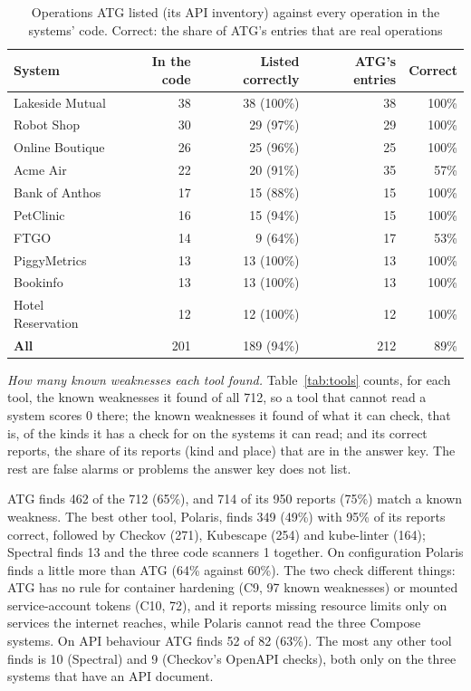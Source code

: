 \documentclass[conference]{IEEEtran}
\begin{document}
\begin{table}[!htbp]
\caption{Operations ATG listed (its API inventory) against every operation in the systems' code. Correct: the share of ATG's entries that are real operations}
\label{tab:ops}
\centering
\footnotesize
\setlength{\tabcolsep}{3pt}
\begin{tabular}{@{}lrrrr@{}}
\toprule
System & In the code & Listed correctly & ATG's entries & Correct \\
\midrule
Lakeside Mutual & 38 & 38 (100\%) & 38 & 100\% \\
Robot Shop & 30 & 29 (97\%) & 29 & 100\% \\
Online Boutique & 26 & 25 (96\%) & 25 & 100\% \\
Acme Air & 22 & 20 (91\%) & 35 & 57\% \\
Bank of Anthos & 17 & 15 (88\%) & 15 & 100\% \\
PetClinic & 16 & 15 (94\%) & 15 & 100\% \\
FTGO & 14 & 9 (64\%) & 17 & 53\% \\
PiggyMetrics & 13 & 13 (100\%) & 13 & 100\% \\
Bookinfo & 13 & 13 (100\%) & 13 & 100\% \\
Hotel Reservation & 12 & 12 (100\%) & 12 & 100\% \\
\textbf{All} & 201 & 189 (94\%) & 212 & 89\% \\
\bottomrule
\end{tabular}
\end{table}

\textit{How many known weaknesses each tool found.} Table~\ref{tab:tools} counts, for each tool, the known weaknesses it found of all 712, so a tool that cannot read a system scores 0 there; the known weaknesses it found of what it can check, that is, of the kinds it has a check for on the systems it can read; and its correct reports, the share of its reports (kind and place) that are in the answer key. The rest are false alarms or problems the answer key does not list.

ATG finds 462 of the 712 (65\%), and 714 of its 950 reports (75\%) match a known weakness. The best other tool, Polaris, finds 349 (49\%) with 95\% of its reports correct, followed by Checkov (271), Kubescape (254) and kube-linter (164); Spectral finds 13 and the three code scanners 1 together. On configuration Polaris finds a little more than ATG (64\% against 60\%). The two check different things: ATG has no rule for container hardening (C9, 97 known weaknesses) or mounted service-account tokens (C10, 72), and it reports missing resource limits only on services the internet reaches, while Polaris cannot read the three Compose systems. On API behaviour ATG finds 52 of 82 (63\%). The most any other tool finds is 10 (Spectral) and 9 (Checkov's OpenAPI checks), both only on the three systems that have an API document.
\end{document}

